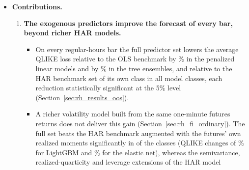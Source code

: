 \begin{itemize}
\begin{itemize}
    reproduce its forecast.
  \item Every forecast is compared with this benchmark, and each class's full predictor set with the HAR benchmark
    set of the same class, the paired comparison that isolates what the exogenous series add.
  \item Accuracy is the average QLIKE loss over the \rhorNIntB{} regular-hours bars of the \rhorDays{} trading days
    from \rhorSpanStart{} to \rhorSpanEnd, with Diebold--Mariano tests on the daily average losses
    \citep{DieboldMariano1995}. QLIKE weighs an error relative to the forecast and, like squared error, ranks
    forecasts consistently despite noise in the realized-variance proxy \citep{Patton2011}.
  \end{itemize}
\item \textbf{Contributions.}
  \begin{enumerate}
  \item \textbf{The exogenous predictors improve the forecast of every bar, beyond richer HAR models.}
    \begin{itemize}
    \item On every regular-hours bar the full predictor set lowers the average QLIKE loss relative to the OLS
      benchmark by \rhorVsOlsRedLinRng{}\% in the penalized linear models and by
      \rhorVsOlsRedTreeRng{}\% in the tree ensembles, and relative to the HAR benchmark set of its own class
      in all \rhorAfPairs{} model classes, each reduction statistically significant at the 5\% level
      (Section~\ref{sec:rh_results_oos}).
    \item A richer volatility model built from the same one-minute futures returns does not deliver this gain
      (Section~\ref{sec:rh_fi_ordinary}). The full set beats the HAR benchmark augmented with the futures' own
      realized moments significantly in \rhabNClassesBeatAddRm{} of the \rhabNClassesAddRm{} classes (QLIKE changes
      of \rhabLgbmFullVsAddRmAllPct\% for LightGBM and \rhabEnetFullVsAddRmAllPct\% for the elastic net), whereas the
      semivariance, realized-quarticity and leverage extensions of the HAR model

\end{itemize}
\end{enumerate}
\end{itemize}
